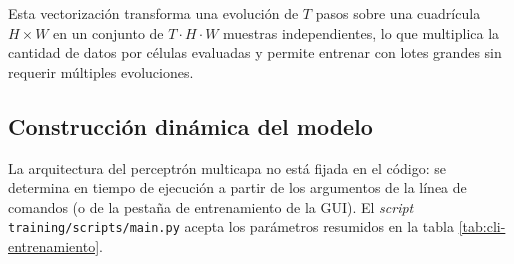 Esta vectorización transforma una evolución de $T$ pasos sobre una cuadrícula $H \times W$ en un conjunto de $T \cdot H \cdot W$ muestras independientes, lo que multiplica la cantidad de datos por células evaluadas y permite entrenar con lotes grandes sin requerir múltiples evoluciones.

\subsection{Construcción dinámica del modelo}

La arquitectura del perceptrón multicapa no está fijada en el código: se determina en tiempo de ejecución a partir de los argumentos de la línea de comandos (o de la pestaña de entrenamiento de la GUI). El \textit{script} \texttt{training/scripts/main.py} acepta los parámetros resumidos en la tabla \ref{tab:cli-entrenamiento}.

